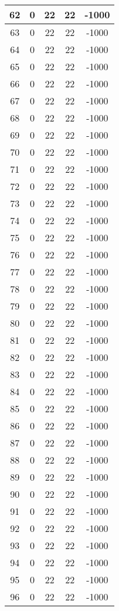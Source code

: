 \documentclass[letterpaper, 12pt]{article}
\begin{document}
\begin{longtable}{|c|c|c|c|c|}
\hline
62 & 0 & 22 & 22 & -1000 \\
\hline
63 & 0 & 22 & 22 & -1000 \\
\hline
64 & 0 & 22 & 22 & -1000 \\
\hline
65 & 0 & 22 & 22 & -1000 \\
\hline
66 & 0 & 22 & 22 & -1000 \\
\hline
67 & 0 & 22 & 22 & -1000 \\
\hline
68 & 0 & 22 & 22 & -1000 \\
\hline
69 & 0 & 22 & 22 & -1000 \\
\hline
70 & 0 & 22 & 22 & -1000 \\
\hline
71 & 0 & 22 & 22 & -1000 \\
\hline
72 & 0 & 22 & 22 & -1000 \\
\hline
73 & 0 & 22 & 22 & -1000 \\
\hline
74 & 0 & 22 & 22 & -1000 \\
\hline
75 & 0 & 22 & 22 & -1000 \\
\hline
76 & 0 & 22 & 22 & -1000 \\
\hline
77 & 0 & 22 & 22 & -1000 \\
\hline
78 & 0 & 22 & 22 & -1000 \\
\hline
79 & 0 & 22 & 22 & -1000 \\
\hline
80 & 0 & 22 & 22 & -1000 \\
\hline
81 & 0 & 22 & 22 & -1000 \\
\hline
82 & 0 & 22 & 22 & -1000 \\
\hline
83 & 0 & 22 & 22 & -1000 \\
\hline
84 & 0 & 22 & 22 & -1000 \\
\hline
85 & 0 & 22 & 22 & -1000 \\
\hline
86 & 0 & 22 & 22 & -1000 \\
\hline
87 & 0 & 22 & 22 & -1000 \\
\hline
88 & 0 & 22 & 22 & -1000 \\
\hline
89 & 0 & 22 & 22 & -1000 \\
\hline
90 & 0 & 22 & 22 & -1000 \\
\hline
91 & 0 & 22 & 22 & -1000 \\
\hline
92 & 0 & 22 & 22 & -1000 \\
\hline
93 & 0 & 22 & 22 & -1000 \\
\hline
94 & 0 & 22 & 22 & -1000 \\
\hline
95 & 0 & 22 & 22 & -1000 \\
\hline
96 & 0 & 22 & 22 & -1000 \\

\end{longtable}
\end{document}
